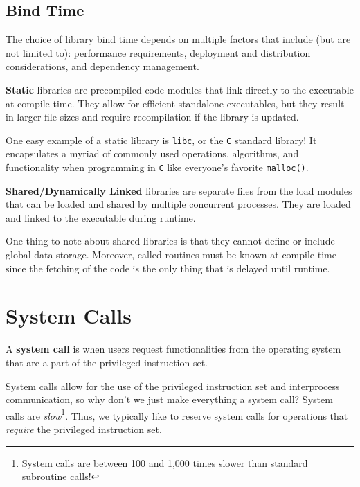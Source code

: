 \documentclass{report}
\begin{document}
\subsection{Bind Time}
The choice of library bind time depends on multiple factors that include (but are not limited to):
performance requirements, deployment and distribution considerations, and dependency
management.

\begin{tcolorbox}[title=Definition: Static]
  \textbf{Static} libraries are precompiled code modules that link directly to the executable at
  compile time. They allow for efficient standalone executables, but they result in larger file
  sizes and require recompilation if the library is updated.  
\end{tcolorbox}
One easy example of a static library is \texttt{libc}, or the \texttt{C} standard library! It
encapsulates a myriad of commonly used operations, algorithms, and functionality when programming in
\texttt{C} like everyone's favorite \texttt{malloc()}. 

\begin{tcolorbox}[title=Definition: Shared/Dynamic]
  \textbf{Shared/Dynamically Linked} libraries are separate files from the load modules that can
  be loaded and shared by multiple concurrent processes. They are loaded and linked to the
  executable during runtime. 
\end{tcolorbox}

One thing to note about shared libraries is that they cannot define or include global data
storage. Moreover, called routines must be known at compile time since the fetching of the code is
the only thing that is delayed until runtime. 


\section{System Calls}
\begin{tcolorbox}[title=Definition: System Call]
  A \textbf{system call} is when users request functionalities from the operating system that are a
  part of the privileged instruction set.
\end{tcolorbox}

System calls allow for the use of the privileged instruction set and interprocess communication, so
why don't we just make everything a system call? System calls are \textit{slow}\footnote{System
  calls are between 100 and 1,000 times slower than standard subroutine calls!}. Thus, we typically
like to reserve system calls for operations that \textit{require} the privileged instruction set.
\end{document}
